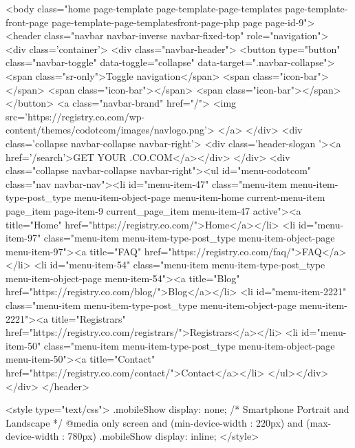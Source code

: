 <body class="home page-template page-template-page-templates page-template-front-page page-template-page-templatesfront-page-php page page-id-9">
    <header class="navbar navbar-inverse navbar-fixed-top" role="navigation">
        <div class='container'>
            <div class="navbar-header">
                <button type="button" class="navbar-toggle" data-toggle="collapse" data-target=".navbar-collapse">
                    <span class="sr-only">Toggle navigation</span>
                    <span class="icon-bar"></span>
                    <span class="icon-bar"></span>
                    <span class="icon-bar"></span>
                </button>
                <a class="navbar-brand" href="/">
                    <img src='https://registry.co.com/wp-content/themes/codotcom/images/navlogo.png'>
                </a>
            </div>
              <div class='collapse navbar-collapse navbar-right'>
                  <div class='header-slogan '><a href='/search'>GET YOUR .CO.COM</a></div>
              </div>
              <div class="collapse navbar-collapse navbar-right"><ul id="menu-codotcom" class="nav navbar-nav"><li id="menu-item-47" class="menu-item menu-item-type-post_type menu-item-object-page menu-item-home current-menu-item page_item page-item-9 current_page_item menu-item-47 active"><a title="Home" href="https://registry.co.com/">Home</a></li>
<li id="menu-item-97" class="menu-item menu-item-type-post_type menu-item-object-page menu-item-97"><a title="FAQ" href="https://registry.co.com/faq/">FAQ</a></li>
<li id="menu-item-54" class="menu-item menu-item-type-post_type menu-item-object-page menu-item-54"><a title="Blog" href="https://registry.co.com/blog/">Blog</a></li>
<li id="menu-item-2221" class="menu-item menu-item-type-post_type menu-item-object-page menu-item-2221"><a title="Registrars" href="https://registry.co.com/registrars/">Registrars</a></li>
<li id="menu-item-50" class="menu-item menu-item-type-post_type menu-item-object-page menu-item-50"><a title="Contact" href="https://registry.co.com/contact/">Contact</a></li>
</ul></div>        </div>
    </header>

<style type="text/css">
   .mobileShow { display: none;}
   /* Smartphone Portrait and Landscape */
   @media only screen
   and (min-device-width : 220px)
   and (max-device-width : 780px){ .mobileShow { display: inline;}}
</style>

